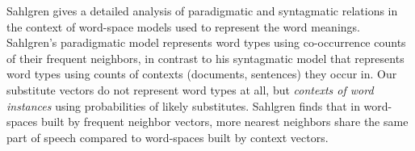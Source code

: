Sahlgren  gives a detailed analysis of
paradigmatic and syntagmatic relations in the context of word-space
models used to represent the word meanings.  Sahlgren's paradigmatic
model represents word types using co-occurrence counts of their
frequent neighbors, in contrast to his syntagmatic model that
represents word types using counts of contexts (documents, sentences)
they occur in.  Our substitute vectors do not represent word types at
all, but {\em contexts of word instances} using probabilities of likely
substitutes.  Sahlgren finds that in word-spaces built by frequent
neighbor vectors, more nearest neighbors share the same part of speech
compared to word-spaces built by context vectors.


